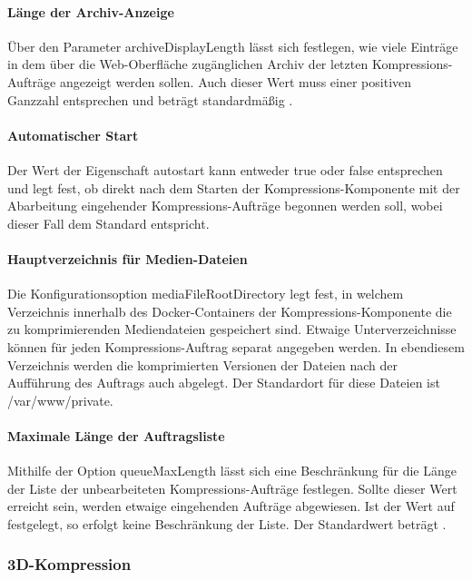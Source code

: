 \paragraph{Länge der Archiv-Anzeige} Über den Parameter {\ttfamily archive\-Display\-Leng\-th} lässt sich festlegen, wie viele Einträge in dem über die Web-Oberfläche zugänglichen Archiv der letzten Kompressions-Aufträge angezeigt werden sollen. Auch dieser Wert muss einer positiven Ganzzahl entsprechen und beträgt standardmäßig {}.

\paragraph{Automatischer Start} Der Wert der Eigenschaft {\ttfamily autostart} kann entweder {\ttfamily true} oder {\ttfamily false} entsprechen und legt fest, ob direkt nach dem Starten der Kompressions-Komponente mit der Abarbeitung eingehender Kompressions-Aufträge begonnen werden soll, wobei dieser Fall dem Standard entspricht.

\paragraph{Hauptverzeichnis für Medien-Dateien} Die Konfigurationsoption {\ttfamily media\-File\-Root\-Directory} legt fest, in welchem Verzeichnis innerhalb des Docker-Containers der Kompressions-Komponente die zu komprimierenden Mediendateien gespeichert sind. Etwaige Unterverzeichnisse können für jeden Kompressions-Auftrag separat angegeben werden. In ebendiesem Verzeichnis werden die komprimierten Versionen der Dateien nach der Aufführung des Auftrags auch abgelegt. Der Standardort für diese Dateien ist {\ttfamily /var/www/private}.

\paragraph{Maximale Länge der Auftragsliste} Mithilfe der Option {\ttfamily queueMaxLength} lässt sich eine Beschränkung für die Länge der Liste der unbearbeiteten Kompressions-Aufträge festlegen. Sollte dieser Wert erreicht sein, werden etwaige eingehenden Aufträge abgewiesen. Ist der Wert auf {} festgelegt, so erfolgt keine Beschränkung der Liste. Der Standardwert beträgt {}.


\subsubsection{3D-Kompression}

